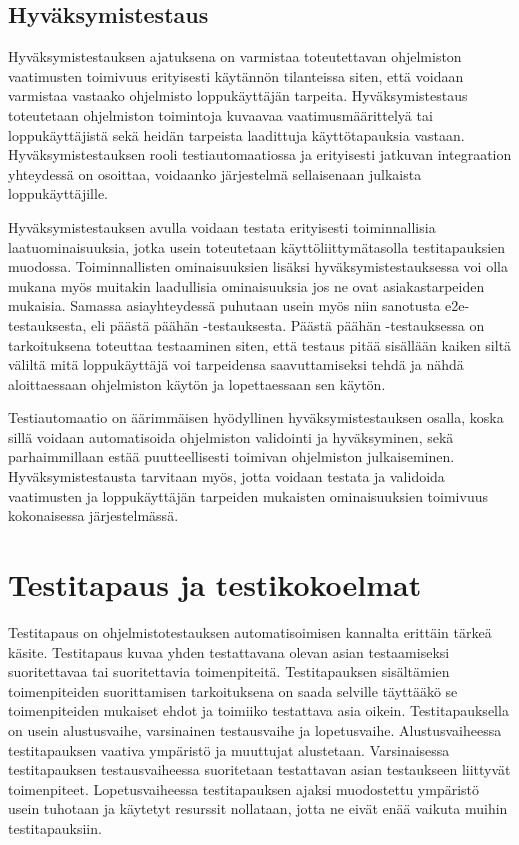   \subsection{Hyväksymistestaus} \label{ch:07_hyvaksymistestaus}

    Hyväksymistestauksen ajatuksena on varmistaa toteutettavan ohjelmiston vaatimusten toimivuus erityisesti käytännön tilanteissa siten, että voidaan varmistaa vastaako ohjelmisto loppukäyttäjän tarpeita.
    Hyväksymistestaus toteutetaan ohjelmiston toimintoja kuvaavaa vaatimusmäärittelyä tai loppukäyttäjistä sekä heidän tarpeista laadittuja käyttötapauksia vastaan.
    Hyväksymistestauksen rooli testiautomaatiossa ja erityisesti jatkuvan integraation yhteydessä on osoittaa, voidaanko järjestelmä sellaisenaan julkaista loppukäyttäjille.

    Hyväksymistestauksen avulla voidaan testata erityisesti toiminnallisia laatuominaisuuksia, jotka usein toteutetaan käyttöliittymätasolla testitapauksien muodossa.
    Toiminnallisten ominaisuuksien lisäksi hyväksymistestauksessa voi olla mukana myös muitakin laadullisia ominaisuuksia jos ne ovat asiakastarpeiden mukaisia.
    Samassa asiayhteydessä puhutaan usein myös niin sanotusta e2e-testauksesta, eli päästä päähän -testauksesta.
    Päästä päähän -testauksessa on tarkoituksena toteuttaa testaaminen siten, että testaus pitää sisällään kaiken siltä väliltä mitä loppukäyttäjä voi tarpeidensa saavuttamiseksi tehdä ja nähdä aloittaessaan ohjelmiston käytön ja lopettaessaan sen käytön.

    Testiautomaatio on äärimmäisen hyödyllinen hyväksymistestauksen osalla, koska sillä voidaan automatisoida ohjelmiston validointi ja hyväksyminen, sekä parhaimmillaan estää puutteellisesti toimivan ohjelmiston julkaiseminen.
    Hyväksymistestausta tarvitaan myös, jotta voidaan testata ja validoida vaatimusten ja loppukäyttäjän tarpeiden mukaisten ominaisuuksien toimivuus kokonaisessa järjestelmässä.

\section{Testitapaus ja testikokoelmat} \label{ch:07_testitapaus_ja_testikokoelmat}

  Testitapaus on ohjelmistotestauksen automatisoimisen kannalta erittäin tärkeä käsite.
  Testitapaus kuvaa yhden testattavana olevan asian testaamiseksi suoritettavaa tai suoritettavia toimenpiteitä.
  Testitapauksen sisältämien toimenpiteiden suorittamisen tarkoituksena on saada selville täyttääkö se toimenpiteiden mukaiset ehdot ja toimiiko testattava asia oikein.
  Testitapauksella on usein alustusvaihe, varsinainen testausvaihe ja lopetusvaihe.
  Alustusvaiheessa testitapauksen vaativa ympäristö ja muuttujat alustetaan.
  Varsinaisessa testitapauksen testausvaiheessa suoritetaan testattavan asian testaukseen liittyvät toimenpiteet.
  Lopetusvaiheessa testitapauksen ajaksi muodostettu ympäristö usein tuhotaan ja käytetyt resurssit nollataan, jotta ne eivät enää vaikuta muihin testitapauksiin.

